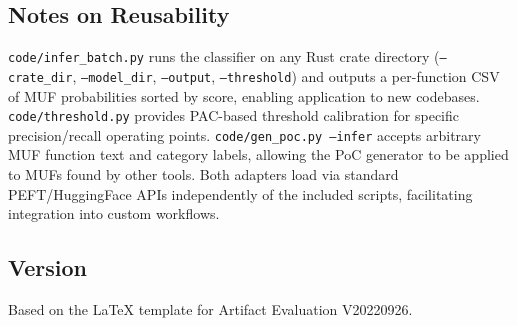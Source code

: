 \documentclass[nonacm,sigconf]{acmart}
\begin{document}

\subsection{Notes on Reusability}

\texttt{code/infer\_batch.py} runs the classifier on any Rust crate
directory (\texttt{--crate\_dir}, \texttt{--model\_dir},
\texttt{--output}, \texttt{--threshold}) and outputs a per-function CSV
of MUF probabilities sorted by score, enabling application to new
codebases. \texttt{code/threshold.py} provides
PAC-based threshold calibration for specific
precision/recall operating points. \texttt{code/gen\_poc.py --infer}
accepts arbitrary MUF function text and category labels, allowing the
PoC generator to be applied to MUFs found by other tools. Both adapters
load via standard PEFT/HuggingFace APIs independently of the included
scripts, facilitating integration into custom workflows.


\subsection{Version}
Based on the LaTeX template for Artifact Evaluation V20220926.
\end{document}
